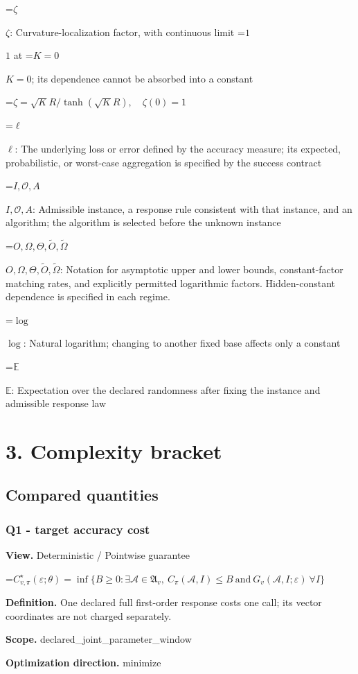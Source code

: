 \documentclass[10pt,a4paper]{article}
\newcommand{\AtlasMath}[1]{\par\begingroup\centering\setbox0=\hbox{$\displaystyle #1$}\ifdim\wd0>1.4\linewidth\typeout{ATLAS WIDE FORMULA: \the\wd0}\fi\ifdim\wd0>\linewidth\resizebox{\linewidth}{!}{\box0}\else\box0\fi\par\endgroup}
\newcommand{\AtlasInlineMath}[1]{\begingroup\setbox0=\hbox{$#1$}\ifdim\wd0>.4\linewidth\endgroup\AtlasMath{#1}\else\endgroup$#1$\fi}
\begin{document}
\AtlasInlineMath{\zeta}: Curvature-localization factor, with continuous limit \AtlasInlineMath{1} at \AtlasInlineMath{K=0}; its dependence cannot be absorbed into a constant


\AtlasMath{\zeta=\sqrt K R/\tanh(\sqrt K R),\quad\zeta(0)=1}


\AtlasInlineMath{\ell}: The underlying loss or error defined by the accuracy measure; its expected, probabilistic, or worst-case aggregation is specified by the success contract

\AtlasInlineMath{I,\mathcal{O},A}: Admissible instance, a response rule consistent with that instance, and an algorithm; the algorithm is selected before the unknown instance

\AtlasInlineMath{O,\Omega,\Theta,\widetilde{O},\widetilde\Omega}: Notation for asymptotic upper and lower bounds, constant-factor matching rates, and explicitly permitted logarithmic factors. Hidden-constant dependence is specified in each regime.

\AtlasInlineMath{\log}: Natural logarithm; changing to another fixed base affects only a constant

\AtlasInlineMath{\mathbb{E}}: Expectation over the declared randomness after fixing the instance and admissible response law

\section{3. Complexity bracket}
\subsection{Compared quantities}
\subsubsection{Q1 - target accuracy cost}
\textbf{View.} Deterministic / Pointwise guarantee

\AtlasMath{C^\star_{v,\pi}(\varepsilon;\theta)=\inf\{B\ge0:\exists\mathcal A\in\mathfrak A_v,\ C_\pi(\mathcal A,I)\le B\ \text{and}\ G_v(\mathcal A,I;\varepsilon)\ \forall I\}}
\textbf{Definition.} One declared full first-order response costs one call; its vector coordinates are not charged separately.

\textbf{Scope.} declared\_joint\_parameter\_window

\textbf{Optimization direction.} minimize
\end{document}
